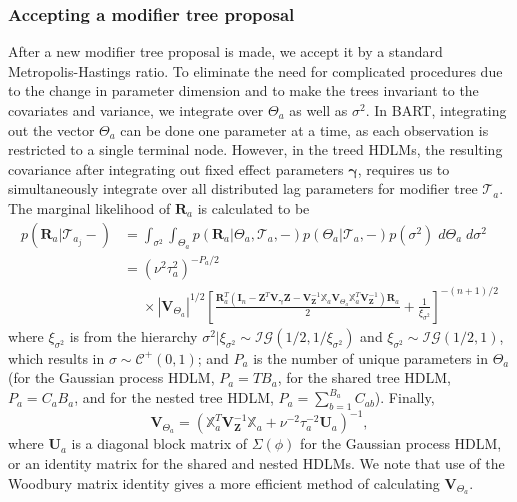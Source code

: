 \documentclass[12pt]{article}
\begin{document}
\subsubsection{Accepting a modifier tree proposal}\label{sec:accept-mod-tree}
After a new modifier tree proposal is made, we accept it by a standard Metropolis-Hastings ratio. To eliminate the need for complicated procedures due to the change in parameter dimension and to make the trees invariant to the covariates and variance, we integrate over $\Theta_a$ as well as $\sigma^2$. In BART, integrating out the vector $\Theta_a$ can be done one parameter at a time, as each observation is restricted to a single terminal node. However, in the treed HDLMs, the resulting covariance after integrating out fixed effect parameters $\boldsymbol\gamma$, requires us to simultaneously integrate over all distributed lag parameters for modifier tree $\mathcal{T}_a$. The marginal likelihood of $\mathbf{R}_a$ is calculated to be
\begin{equation}
\begin{split}
p(\mathbf{R}_a|\mathcal{T}_{a_j}-) &=
\int_{\sigma^2}\int_{\Theta_a}
 p(\mathbf{R}_{a}|\Theta_a,\mathcal{T}_{a},-) 
 p(\Theta_a|\mathcal{T}_a,-) 
 p(\sigma^2)\; 
 d\Theta_a\; d\sigma^2\\
&=\left(\nu^2\tau_a^2\right)^{-P_a/2}\\
&\phantom{=}
\times\left\vert\mathbf{V}_{\Theta_a}\right\vert^{1/2}
\left[\frac{\mathbf{R}_a^T\left(\mathbf{I}_n-
    \mathbf{Z}^T\mathbf{V}_{\boldsymbol{\gamma}}\mathbf{Z}-
    \mathbf{V}_\mathbf{Z}^{-1}\mathbb{X}_a \mathbf{V}_{\Theta_a} \mathbb{X}_a^T \mathbf{V}_\mathbf{Z}^{-1}\right)
\mathbf{R}_a}{2}+\frac{1}{\xi_{\sigma^2}}\right]^{-(n+1)/2}
\end{split}
\end{equation}
where $\xi_{\sigma^2}$ is from the hierarchy  $\sigma^2|\xi_{\sigma^2}\sim\mathcal{IG}(1/2,1/\xi_{\sigma^2})$ and $\xi_{\sigma^2}\sim\mathcal{IG}(1/2,1)$, which results in $\sigma\sim\mathcal{C}^+(0,1)$; and $P_a$ is the number of unique parameters in $\Theta_a$ (for the Gaussian process HDLM, $P_a=TB_a$, for the shared tree HDLM, $P_a=C_aB_a$, and for the nested tree HDLM, $P_a=\sum_{b=1}^{B_a}C_{ab}$). Finally,
\begin{equation}
    \mathbf{V}_{\Theta_a}=\left(\mathbb{X}_a^T \mathbf{V}_\mathbf{Z}^{-1}\mathbb{X}_a+\nu^{-2}\tau_a^{-2}\mathbf{U}_a\right)^{-1},
\end{equation}
where $\mathbf{U}_a$ is a diagonal block matrix of $\Sigma(\phi)$ for the Gaussian process HDLM, or an identity matrix for the shared and nested HDLMs. We note that use of the Woodbury matrix identity gives a more efficient method of calculating $\mathbf{V}_{\Theta_a}$.
\end{document}
